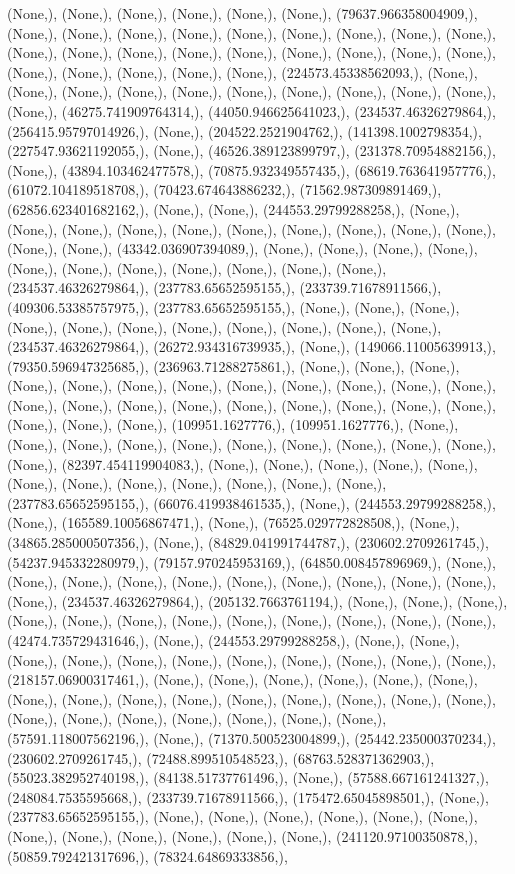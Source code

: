 \documentclass{article}
\begin{document}
(None,), (None,), (None,), (None,), (None,), (None,), (79637.966358004909,), (None,), (None,), (None,), (None,), (None,), (None,), (None,), (None,), (None,), (None,), (None,), (None,), (None,), (None,), (None,), (None,), (None,), (None,), (None,), (None,), (None,), (None,), (None,), (224573.45338562093,), (None,), (None,), (None,), (None,), (None,), (None,), (None,), (None,), (None,), (None,), (None,), (46275.741909764314,), (44050.946625641023,), (234537.46326279864,), (256415.95797014926,), (None,), (204522.2521904762,), (141398.1002798354,), (227547.93621192055,), (None,), (46526.389123899797,), (231378.70954882156,), (None,), (43894.103462477578,), (70875.932349557435,), (68619.763641957776,), (61072.104189518708,), (70423.674643886232,), (71562.987309891469,), (62856.623401682162,), (None,), (None,), (244553.29799288258,), (None,), (None,), (None,), (None,), (None,), (None,), (None,), (None,), (None,), (None,), (None,), (None,), (43342.036907394089,), (None,), (None,), (None,), (None,), (None,), (None,), (None,), (None,), (None,), (None,), (None,), (234537.46326279864,), (237783.65652595155,), (233739.71678911566,), (409306.53385757975,), (237783.65652595155,), (None,), (None,), (None,), (None,), (None,), (None,), (None,), (None,), (None,), (None,), (None,), (234537.46326279864,), (26272.934316739935,), (None,), (149066.11005639913,), (79350.596947325685,), (236963.71288275861,), (None,), (None,), (None,), (None,), (None,), (None,), (None,), (None,), (None,), (None,), (None,), (None,), (None,), (None,), (None,), (None,), (None,), (None,), (None,), (None,), (None,), (None,), (None,), (None,), (109951.1627776,), (109951.1627776,), (None,), (None,), (None,), (None,), (None,), (None,), (None,), (None,), (None,), (None,), (None,), (82397.454119904083,), (None,), (None,), (None,), (None,), (None,), (None,), (None,), (None,), (None,), (None,), (None,), (None,), (237783.65652595155,), (66076.419938461535,), (None,), (244553.29799288258,), (None,), (165589.10056867471,), (None,), (76525.029772828508,), (None,), (34865.285000507356,), (None,), (84829.041991744787,), (230602.2709261745,), (54237.945332280979,), (79157.970245953169,), (64850.008457896969,), (None,), (None,), (None,), (None,), (None,), (None,), (None,), (None,), (None,), (None,), (None,), (234537.46326279864,), (205132.7663761194,), (None,), (None,), (None,), (None,), (None,), (None,), (None,), (None,), (None,), (None,), (None,), (None,), (42474.735729431646,), (None,), (244553.29799288258,), (None,), (None,), (None,), (None,), (None,), (None,), (None,), (None,), (None,), (None,), (None,), (218157.06900317461,), (None,), (None,), (None,), (None,), (None,), (None,), (None,), (None,), (None,), (None,), (None,), (None,), (None,), (None,), (None,), (None,), (None,), (None,), (None,), (None,), (None,), (None,), (57591.118007562196,), (None,), (71370.500523004899,), (25442.235000370234,), (230602.2709261745,), (72488.899510548523,), (68763.528371362903,), (55023.382952740198,), (84138.51737761496,), (None,), (57588.667161241327,), (248084.7535595668,), (233739.71678911566,), (175472.65045898501,), (None,), (237783.65652595155,), (None,), (None,), (None,), (None,), (None,), (None,), (None,), (None,), (None,), (None,), (None,), (None,), (241120.97100350878,), (50859.792421317696,), (78324.64869333856,), 
\end{document}
